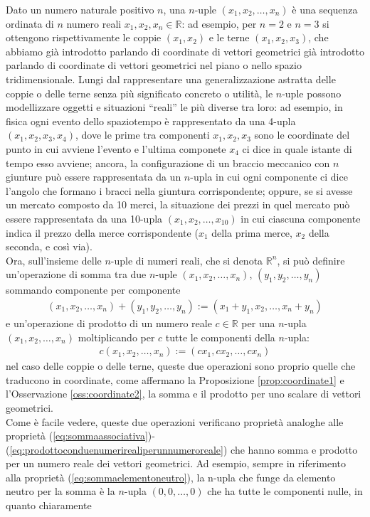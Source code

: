 Dato un numero naturale positivo $n$, una $n$-uple $(x_1,x_2,\dots,x_n)$ è una sequenza ordinata di $n$ numero reali $x_1,x_2,x_n\in\mathds{R}$: ad esempio, per $n=2$ e $n=3$ si ottengono rispettivamente le coppie $(x_1,x_2)$ e le terne $(x_1,x_2,x_3)$, che abbiamo già introdotto parlando di coordinate di vettori geometrici già introdotto parlando di coordinate di vettori geometrici nel piano o nello spazio tridimensionale. Lungi dal rappresentare una generalizzazione astratta delle coppie o delle terne senza più significato concreto o utilità, le $n$-uple possono modellizzare oggetti e situazioni ``reali'' le più diverse tra loro: ad esempio, in fisica ogni evento dello spaziotempo è rappresentato da una 4-upla $(x_1,x_2,x_3,x_4)$, dove le prime tra componenti $x_1,x_2,x_3$ sono le coordinate del punto in cui avviene l'evento e l'ultima componete $x_4$ ci dice in quale istante di tempo esso avviene; ancora, la configurazione di un braccio meccanico con $n$ giunture può essere rappresentata da un $n$-upla in cui ogni componente ci dice l'angolo che formano i bracci nella giuntura corrispondente; oppure, se si avesse un mercato composto da 10 merci, la situazione dei prezzi in quel mercato può essere rappresentata da una 10-upla $(x_1,x_2,\dots,x_{10})$ in cui ciascuna componente indica il prezzo della merce corrispondente ($x_1$ della prima merce, $x_2$ della seconda, e così via).\\
Ora, sull'insieme delle $n$-uple di numeri reali, che si denota $\mathds{R}^n$, si può definire un'operazione di somma tra due $n$-uple $(x_1,x_2,\dots, x_n)$, $(y_1,y_2,\dots, y_n)$ sommando componente per componente
\begin{eqnarray}
  \label{eq:spaziovect1}
  (x_1,x_2,\dots, x_n)+(y_1,y_2,\dots, y_n):=(x_1+y_1,x_2,\dots,x_n+y_n)
\end{eqnarray}
e un'operazione di prodotto di un numero reale $c\in \mathds{R}$ per una $n$-upla $(x_1,x_2,\dots, x_n)$ moltiplicando per $c$ tutte le componenti della $n$-upla:
\begin{eqnarray}
  \label{eq:spaziovect2}
  c(x_1,x_2,\dots, x_n):=(cx_1,cx_2,\dots, cx_n)
\end{eqnarray}
nel caso delle coppie o delle terne, queste due operazioni sono proprio quelle che traducono in coordinate, come affermano la Proposizione \ref{prop:coordinate1} e l'Osservazione \ref{oss:coordinate2}, la somma e il prodotto per uno scalare di vettori geometrici.\\
Come è facile vedere, queste due operazioni verificano proprietà analoghe alle proprietà (\ref{eq:sommaassociativa})-(\ref{eq:prodottoconduenumerirealiperunnumeroreale}) che hanno somma e prodotto per un numero reale dei vettori geometrici. Ad esempio, sempre in riferimento alla proprietà (\ref{eq:sommaelementoneutro}), la n-upla che funge da elemento neutro per la somma è la $n$-upla $(0,0,\dots, 0)$ che ha tutte le componenti nulle, in quanto chiaramente
